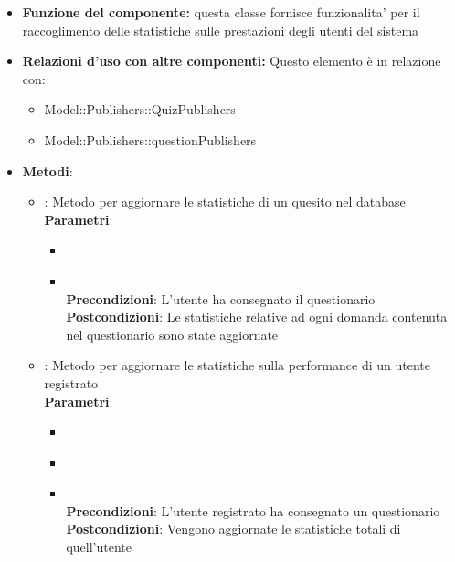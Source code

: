 \begin{itemize}
\item\textbf{Funzione del componente:} questa classe fornisce funzionalita' per il raccoglimento delle statistiche sulle prestazioni degli utenti del sistema
\item\textbf{Relazioni d'uso con altre componenti:}
Questo elemento è in relazione con:
\begin{itemize}
	\item Model::Publishers::QuizPublishers\\
	\item Model::Publishers::questionPublishers\\
\end{itemize}
\item\textbf{Metodi}:
\begin{itemize}
	\item{} : Metodo per aggiornare le statistiche di un quesito nel database\\
	\textbf{Parametri}:
	\begin{itemize}
		\item{}\\
		\item{}\\
		\textbf{Precondizioni}: L'utente ha consegnato il questionario\\
		\textbf{Postcondizioni}: Le statistiche relative ad ogni domanda contenuta nel questionario sono state aggiornate\\
	\end{itemize}
	\item{} : Metodo per aggiornare le statistiche sulla performance di un utente registrato\\
	\textbf{Parametri}:
	\begin{itemize}
		\item{}\\
		\item{}\\
		\item{}\\
		\textbf{Precondizioni}: L'utente registrato ha consegnato un questionario\\
		\textbf{Postcondizioni}: Vengono aggiornate le statistiche totali di quell'utente\\
	\end{itemize}

\end{itemize}
\end{itemize}
